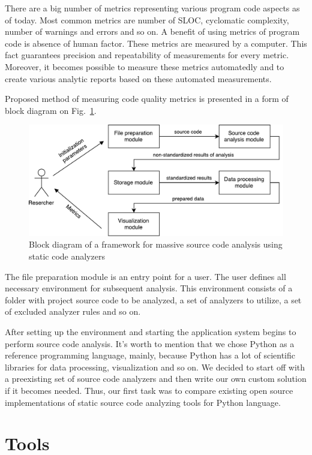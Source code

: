 There are a big number of metrics representing various program code aspects
as of today. Most common metrics are number of SLOC, cyclomatic complexity,
number of warnings and errors and so on. A benefit of using metrics of program
code is absence of human factor. These metrics are measured by a computer.
This fact guarantees precision and repeatability of measurements for every
metric. Moreover, it becomes possible to measure these metrics automatedly
and to create various analytic reports based on these automated measurements.

Proposed method of measuring code quality metrics is presented in a form of
block diagram on Fig.~\ref{fig:structscheme}.

\begin{figure}[h]
\centering
\includegraphics[width=1\linewidth]{structscheme.pdf}
\caption{Block diagram of a framework for massive source code analysis using static code analyzers}
\label{fig:structscheme}
\end{figure}

The file preparation module is an entry point for a user. The user defines
all necessary environment for subsequent analysis. This environment consists
of a folder with project source code to be analyzed, a set of analyzers
to utilize, a set of excluded analyzer rules and so on.

After setting up the environment and starting the application system begins
to perform source code analysis. It's worth to mention that we chose Python
as a reference programming language, mainly, because Python has a lot of
scientific libraries for data processing, visualization and so on. We decided
to start off with a preexisting set of source code analyzers and then write
our own custom solution if it becomes needed. Thus, our first task was to
compare existing open source implementations of static source code
analyzing tools for Python language.

\section{Tools}

